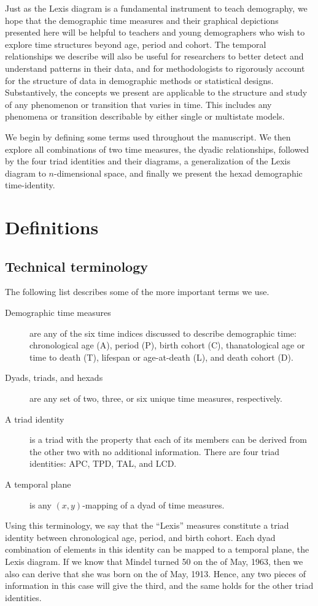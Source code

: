 \documentclass{bmcart}
\theoremstyle{definition}
\begin{document}
Just as the Lexis diagram is a fundamental instrument to
teach demography, we hope that the demographic time measures and
their graphical depictions presented here will be helpful to teachers and
young demographers who wish to explore time structures beyond age, period and
cohort. The temporal relationships we describe will also be useful for researchers to better detect and understand patterns in their data, and for
methodologists to rigorously account for the structure of data in demographic
methods or statistical designs. Substantively, the concepts we present
are applicable to the structure and study of any phenomenon or transition that
varies in time. This includes any phenomena or transition
describable by either single or multistate models. 

We begin by defining some terms used throughout the manuscript.
We then explore all combinations of two time measures, the dyadic relationships,
followed by the four triad identities and their diagrams, a generalization of
the Lexis diagram to $n$-dimensional space, and finally we present the hexad
demographic time-identity.


\section{Definitions}
\subsection{Technical terminology}
The following list describes some of the more important terms we use.
\begin{description}
\item[Demographic time measures] are any of the six time indices discussed to
describe demographic time: chronological age (A), period (P), birth cohort (C),
thanatological age or time to death (T), lifespan or age-at-death (L), and death
cohort (D).
\item[Dyads, triads, and hexads] are any set of two, three, or six unique time
measures, respectively.
\item[A triad identity] is a triad with the property that each of its members
can be derived from the other two with no additional information. There are four triad
identities: APC, TPD, TAL, and LCD.
\item[A temporal plane] is any $(x,y)$-mapping of a dyad of time measures.
\end{description}
Using this terminology, we say that the ``Lexis'' measures
constitute a triad identity between chronological age, period, and birth cohort. Each dyad
combination of elements in this identity can be mapped to a
temporal plane, the Lexis diagram. If we know that Mindel turned 50 on the
 of May, 1963, then we also can derive that she was born on the  of
May, 1913. Hence, any two pieces of information in this case will give the
third, and the same holds for the other triad identities.
\end{document}
